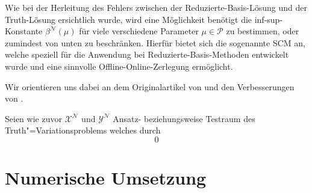 \documentclass[../main.tex]{subfiles}
\begin{document}
Wie bei der Herleitung des Fehlers zwischen der Reduzierte-Basis-Lösung und der Truth-Lösung ersichtlich wurde, wird eine Möglichkeit benötigt die inf-sup-Konstante $\beta^{\mathcal N}(\mu)$ für viele verschiedene Parameter $\mu \in \mathcal P$ zu bestimmen, oder zumindest von unten zu beschränken.
Hierfür bietet sich die sogenannte \ac{SCM} an, welche speziell für die Anwendung bei Reduzierte-Basis-Methoden entwickelt wurde und eine sinnvolle Offline-Online-Zerlegung ermöglicht.

Wir orientieren uns dabei an dem Originalartikel von \textcite{Huynh2007} und den Verbesserungen von \textcite{Chen2009}.

Seien wie zuvor $\mathcal X^{\mathcal N}$ und $\mathcal Y^{\mathcal N}$ Ansatz- beziehungsweise Testraum des Truth"=Variationsproblems welches durch
\begin{equation}
0
\end{equation}




\section{Numerische Umsetzung} %
\label{sub:grb:rb:numerische_umsetzung}



\end{document}
